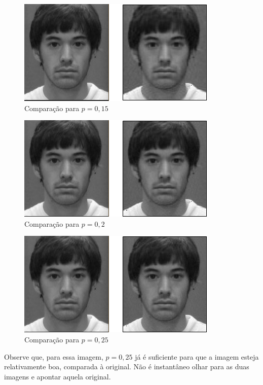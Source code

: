 \documentclass[11pt]{article}
\begin{document}
\begin{enumerate}
            \begin{figure}[H]
                \centering
                \includegraphics[]{2-1-15}
                \caption{Comparação para $p = 0,15$}
            \end{figure}
            
            \begin{figure}[H]
                \centering
                \includegraphics[]{2-1-20}
                \caption{Comparação para $p = 0,2$}
            \end{figure}
            
            \begin{figure}[H]
                \centering
                \includegraphics[]{2-1-25}
                \caption{Comparação para $p = 0,25$}
            \end{figure}
            
            Observe que, para essa imagem, $p = 0,25$ já é suficiente para que a imagem esteja relativamente boa, comparada à original. Não é instantâneo olhar para as duas imagens e apontar aquela original.
            

\end{enumerate}
\end{document}
